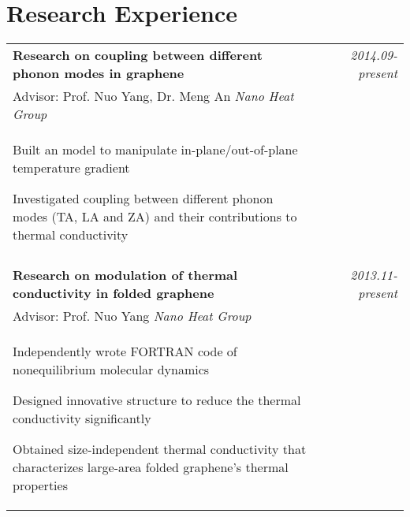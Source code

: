 \documentclass[a4paper,10pt]{article}
\begin{document}
\section{Research Experience}
\begin{tabular}{p{13.5cm}p{0.5cm}r}
\textbf{Research on coupling between different phonon modes in graphene} && \emph{2014.09-present} \\
\hspace{1em} Advisor: Prof. Nuo Yang, Dr. Meng An \hspace{3em} \emph{Nano Heat Group} && \vspace{-0.5em}\\
\begin{compactitem}
       \item Built an model to manipulate in-plane/out-of-plane temperature gradient\vspace{0.2em}
       \item Investigated coupling between different phonon modes (TA, LA and ZA) and their contributions to thermal conductivity\vspace{0.2em}
     \end{compactitem}&&\vspace{-2.2em} \\
\multicolumn{3}{c}{} \\
\textbf{Research on modulation of thermal conductivity in folded graphene} && \emph{2013.11-present} \\
\hspace{1em} Advisor: Prof. Nuo Yang \hspace{9em} \emph{Nano Heat Group} && \vspace{-0.5em}\\
\begin{compactitem}
       \item Independently wrote FORTRAN code of nonequilibrium molecular dynamics\vspace{0.2em}
       \item Designed innovative structure to reduce the thermal conductivity significantly\vspace{0.2em}
       \item Obtained size-independent thermal conductivity that characterizes large-area folded graphene's thermal properties
     \end{compactitem}&&\vspace{-2.2em} \\

\end{tabular}
\end{document}
